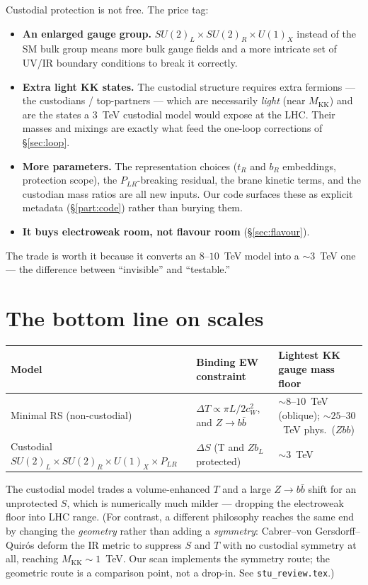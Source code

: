 \documentclass[11pt]{article}
\newcommand{\MKK}{M_{\mathrm{KK}}}
\newcommand{\cwsq}{c_W^2}
\newcommand{\SUL}{SU(2)_L}
\newcommand{\SUR}{SU(2)_R}
\newcommand{\UX}{U(1)_X}
\newcommand{\PLR}{P_{LR}}
\newcommand{\code}[1]{\texttt{#1}}
\theoremstyle{definition}
\begin{document}
Custodial protection is not free. The price tag:
\begin{itemize}[leftmargin=1.4em]
\item \textbf{An enlarged gauge group.} $\SUL\times\SUR\times\UX$ instead of the
SM bulk group means more bulk gauge fields and a more intricate set of UV/IR
boundary conditions to break it correctly.
\item \textbf{Extra light KK states.} The custodial structure requires extra
fermions --- the custodians / top-partners --- which are necessarily \emph{light}
(near $\MKK$) and are the states a $3$~TeV custodial model would expose at the
LHC. Their masses and mixings are exactly what feed the one-loop corrections of
\S\ref{sec:loop}.
\item \textbf{More parameters.} The representation choices ($t_R$ and $b_R$
embeddings, protection scope), the $\PLR$-breaking residual, the brane kinetic
terms, and the custodian mass ratios are all new inputs. Our code surfaces these
as explicit metadata (\S\ref{part:code}) rather than burying them.
\item \textbf{It buys electroweak room, not flavour room} (\S\ref{sec:flavour}).
\end{itemize}
The trade is worth it because it converts an $8$--$10$~TeV model into a $\sim
3$~TeV one --- the difference between ``invisible'' and ``testable.''

\section{The bottom line on scales}
\label{sec:scales}

\begin{center}
\begin{tabular}{lll}
\toprule
Model & Binding EW constraint & Lightest KK gauge mass floor \\
\midrule
Minimal RS (non-custodial) & $\Delta T\propto \pi L/2\cwsq$, and $Z\to b\bar b$ & $\sim 8$--$10$~TeV (oblique); $\sim 25$--$30$~TeV phys.\ ($Zbb$) \\
Custodial $\SUL\times\SUR\times\UX\times\PLR$ & $\Delta S$ (T and $Zb_L$ protected) & $\sim 3$~TeV \\
\bottomrule
\end{tabular}
\end{center}
The custodial model trades a volume-enhanced $T$ and a large $Z\to b\bar b$ shift
for an unprotected $S$, which is numerically much milder --- dropping the
electroweak floor into LHC range. (For contrast, a different philosophy reaches
the same end by changing the \emph{geometry} rather than adding a \emph{symmetry}:
Cabrer--von Gersdorff--Quir\'os deform the IR metric to suppress $S$ and $T$ with
no custodial symmetry at all, reaching $\MKK\sim 1$~TeV. Our scan implements the
symmetry route; the geometric route is a comparison point, not a drop-in. See
\code{stu\_review.tex}.)
\end{document}
